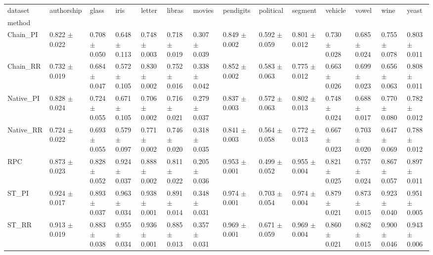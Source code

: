 \begin{tabular}{llllllllllllll}
\toprule
dataset &           authorship &                glass &                 iris &               letter &               libras &               movies &            pendigits &            political &              segment &              vehicle &                vowel &                 wine &                yeast \\
method    &                      &                      &                      &                      &                      &                      &                      &                      &                      &                      &                      &                      &                      \\
\midrule
Chain_PI  &  0.822 $ \pm $ 0.022 &  0.708 $ \pm $ 0.050 &  0.648 $ \pm $ 0.113 &  0.748 $ \pm $ 0.003 &  0.718 $ \pm $ 0.019 &  0.307 $ \pm $ 0.039 &  0.849 $ \pm $ 0.002 &  0.592 $ \pm $ 0.059 &  0.801 $ \pm $ 0.012 &  0.730 $ \pm $ 0.028 &  0.685 $ \pm $ 0.024 &  0.755 $ \pm $ 0.078 &  0.803 $ \pm $ 0.011 \\
Chain_RR  &  0.732 $ \pm $ 0.019 &  0.684 $ \pm $ 0.047 &  0.572 $ \pm $ 0.105 &  0.830 $ \pm $ 0.002 &  0.752 $ \pm $ 0.016 &  0.338 $ \pm $ 0.042 &  0.852 $ \pm $ 0.002 &  0.583 $ \pm $ 0.063 &  0.775 $ \pm $ 0.012 &  0.663 $ \pm $ 0.026 &  0.699 $ \pm $ 0.023 &  0.656 $ \pm $ 0.063 &  0.808 $ \pm $ 0.011 \\
Native_PI &  0.828 $ \pm $ 0.024 &  0.724 $ \pm $ 0.055 &  0.671 $ \pm $ 0.105 &  0.706 $ \pm $ 0.002 &  0.716 $ \pm $ 0.021 &  0.279 $ \pm $ 0.037 &  0.837 $ \pm $ 0.003 &  0.572 $ \pm $ 0.063 &  0.802 $ \pm $ 0.013 &  0.748 $ \pm $ 0.024 &  0.688 $ \pm $ 0.017 &  0.770 $ \pm $ 0.080 &  0.782 $ \pm $ 0.012 \\
Native_RR &  0.724 $ \pm $ 0.022 &  0.693 $ \pm $ 0.055 &  0.579 $ \pm $ 0.097 &  0.771 $ \pm $ 0.002 &  0.746 $ \pm $ 0.020 &  0.318 $ \pm $ 0.035 &  0.841 $ \pm $ 0.003 &  0.564 $ \pm $ 0.058 &  0.772 $ \pm $ 0.013 &  0.667 $ \pm $ 0.023 &  0.703 $ \pm $ 0.020 &  0.647 $ \pm $ 0.069 &  0.788 $ \pm $ 0.012 \\
RPC       &  0.873 $ \pm $ 0.023 &  0.828 $ \pm $ 0.052 &  0.924 $ \pm $ 0.037 &  0.888 $ \pm $ 0.002 &  0.811 $ \pm $ 0.022 &  0.205 $ \pm $ 0.036 &  0.953 $ \pm $ 0.001 &  0.499 $ \pm $ 0.052 &  0.955 $ \pm $ 0.004 &  0.821 $ \pm $ 0.025 &  0.757 $ \pm $ 0.024 &  0.867 $ \pm $ 0.057 &  0.897 $ \pm $ 0.011 \\
ST_PI     &  0.924 $ \pm $ 0.017 &  0.893 $ \pm $ 0.037 &  0.963 $ \pm $ 0.034 &  0.938 $ \pm $ 0.001 &  0.891 $ \pm $ 0.014 &  0.348 $ \pm $ 0.031 &  0.974 $ \pm $ 0.001 &  0.703 $ \pm $ 0.054 &  0.974 $ \pm $ 0.004 &  0.879 $ \pm $ 0.021 &  0.873 $ \pm $ 0.015 &  0.923 $ \pm $ 0.040 &  0.951 $ \pm $ 0.005 \\
ST_RR     &  0.913 $ \pm $ 0.019 &  0.883 $ \pm $ 0.038 &  0.955 $ \pm $ 0.034 &  0.936 $ \pm $ 0.001 &  0.885 $ \pm $ 0.013 &  0.357 $ \pm $ 0.031 &  0.969 $ \pm $ 0.001 &  0.671 $ \pm $ 0.059 &  0.969 $ \pm $ 0.004 &  0.860 $ \pm $ 0.021 &  0.862 $ \pm $ 0.015 &  0.900 $ \pm $ 0.046 &  0.943 $ \pm $ 0.006 \\
\bottomrule
\end{tabular}
